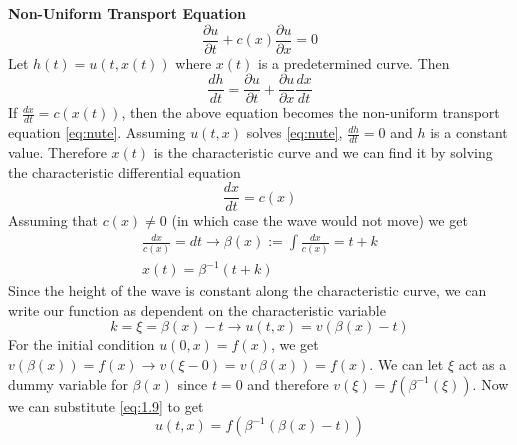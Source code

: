 \documentclass{article}
\newcommand{\pd}[2]{\frac{\partial #1}{\partial #2}}
\newcommand{\od}[2]{\frac{d #1}{d #2}}
\numberwithin{equation}{section}
\begin{document}
\textbf{Non-Uniform Transport Equation}
\begin{equation}
    \pd{u}{t} + c(x)\pd{u}{x} = 0 \label{eq:nute}
\end{equation}
Let $h(t) = u(t,x(t))$ where $x(t)$ is a predetermined curve. Then 
\begin{equation*}
    \od{h}{t} = \pd{u}{t} + \pd{u}{x}\od{x}{t}
\end{equation*}
If $\od{x}{t} = c(x(t))$, then the above equation becomes the non-uniform transport equation \eqref{eq:nute}. Assuming $u(t,x)$ solves \eqref{eq:nute}, $\od{h}{t} = 0$ and $h$ is a constant value. Therefore $x(t)$ is the characteristic curve and we can find it by solving the characteristic differential equation 
\begin{equation}
    \od{x}{t} = c(x) \label{eq:1.7}
\end{equation}
Assuming that $c(x) \neq 0 $ (in which case the wave would not move) we get 
\begin{equation}
\begin{split}
    \frac{dx}{c(x)} = dt \rightarrow \beta(x) := \int\frac{dx}{c(x)} = t+ k \label{eq:1.8} \\
    x(t) = \beta^{-1} (t+k)
\end{split}
\end{equation}
Since the height of the wave is constant along the characteristic curve, we can write our function as dependent on the characteristic variable
\begin{equation}
    k=\xi=\beta(x)-t \rightarrow u(t,x) = v(\beta(x)-t)\label{eq:1.9}
\end{equation}
For the initial condition $u(0,x) = f(x)$, we get $v(\beta(x)) = f(x) \rightarrow v(\xi-0)=v(\beta(x)) = f(x)$. We can let $\xi$ act as a dummy variable for $\beta(x)$ since $t=0$ and therefore $v(\xi) = f(\beta^{-1}(\xi))$. Now we can substitute \eqref{eq:1.9} to get
\begin{equation}
    u(t,x)=f(\beta^{-1}(\beta(x)-t)) \label{eq:1.10}
\end{equation}
\end{document}
